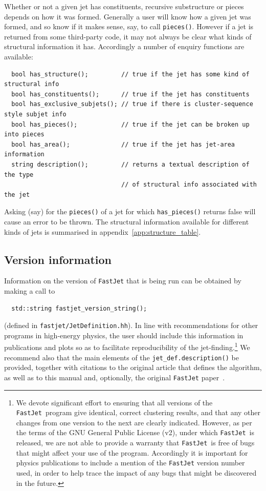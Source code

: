 \documentclass[12pt,a4]{article}
\newcommand{\fastjet}{\texttt{FastJet}\xspace}
\newcommand{\ttt}[1]{{\small\texttt{#1}}}
\begin{document}
Whether or not a given jet has constituents, recursive substructure or
pieces depends on how it was formed. 
%
Generally a user will know how a given jet was formed, and so know if
it makes sense, say, to call \ttt{pieces()}.  
%
However if a jet is returned from some third-party code, it may not
always be clear what kinds of structural information it has. 
%
Accordingly a number of enquiry functions are available:
\begin{lstlisting}
  bool has_structure();         // true if the jet has some kind of structural info
  bool has_constituents();      // true if the jet has constituents 
  bool has_exclusive_subjets(); // true if there is cluster-sequence style subjet info
  bool has_pieces();            // true if the jet can be broken up into pieces
  bool has_area();              // true if the jet has jet-area information
  string description();         // returns a textual description of the type
                                // of structural info associated with the jet
\end{lstlisting}
Asking (say) for the \ttt{pieces()} of a jet for which
\ttt{has\_pieces()} returns false will cause an error to be thrown.
%
The structural information available for different kinds of jets is
summarised in appendix~\ref{app:structure_table}.



\subsection{Version information}
\label{sec:version-information}

Information on the version of \fastjet that is being run can be
obtained by making a call to 
\begin{lstlisting}
  std::string fastjet_version_string();
\end{lstlisting}
(defined in \ttt{fastjet/JetDefinition.hh}).  
%
In line with recommendations for other programs in high-energy
physics, the user should include this information in publications and
plots so as to facilitate reproducibility of the
jet-finding.\footnote{We devote significant effort to ensuring that
  all versions of the \fastjet\ program give identical, correct
  clustering results, and that any other changes from one version to
  the next are clearly indicated.
  However, as per the terms of the GNU General Public License (v2),
  under which \fastjet\ is released, we are not able to provide
  a warranty that \fastjet\ is free of bugs that might affect your use
  of the program.
  Accordingly it is important for physics publications to include a
  mention of the \fastjet version number used, in order to help trace
  the impact of any bugs that might be discovered in the future.  }
%
We recommend also that the main elements of the
\ttt{jet\_def.description()} be provided, together with citations to
the original article that defines the algorithm, as well as to this
manual and, optionally, the original \fastjet paper~\cite{fastjet}.
\end{document}
